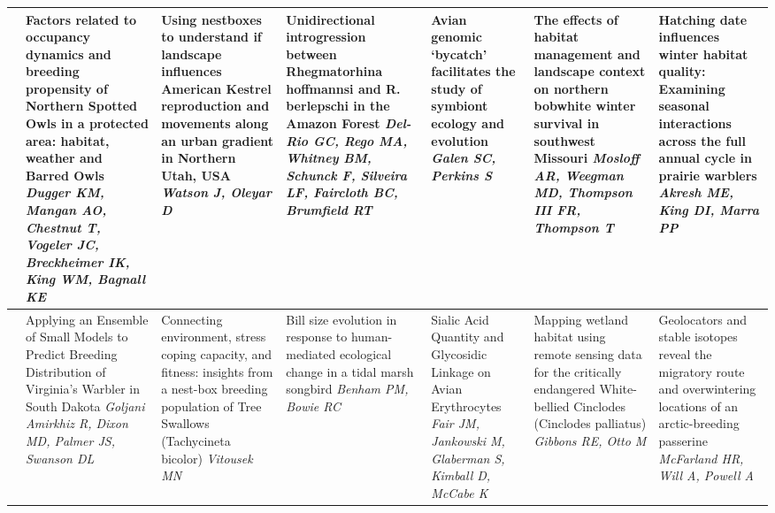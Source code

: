 \begin{tabular}{|x{0.75cm}|x{2.25cm}|a{2.25cm}|x{2.25cm}|x{2.25cm}|x{2.25cm}|x{2.25cm}|}
&Factors related to occupancy dynamics and breeding propensity of Northern Spotted Owls in a protected area: habitat, weather and Barred Owls \newline \newline \textit{Dugger KM, Mangan AO, Chestnut T, Vogeler JC, Breckheimer IK, King WM, Bagnall KE} & Using nestboxes to understand if landscape influences American Kestrel reproduction and movements along an urban gradient in Northern Utah, USA \newline \newline \textit{Watson J, Oleyar D} & Unidirectional introgression between Rhegmatorhina hoffmannsi and R. berlepschi in the Amazon Forest \newline \newline \textit{Del-Rio GC, Rego MA, Whitney BM, Schunck F, Silveira LF, Faircloth BC, Brumfield RT} & Avian genomic ‘bycatch’ facilitates the study of symbiont ecology and evolution \newline \newline \textit{Galen SC, Perkins S} & The effects of habitat management and landscape context on northern bobwhite winter survival in southwest Missouri \newline \newline \textit{Mosloff AR, Weegman MD, Thompson III FR, Thompson T} & Hatching date influences winter habitat quality: Examining seasonal interactions across the full annual cycle in prairie warblers \newline \newline \textit{Akresh ME, King DI, Marra PP}\\
\hline
{}&Applying an Ensemble of Small Models to Predict Breeding Distribution of Virginia’s Warbler in South Dakota \newline \newline \textit{Goljani Amirkhiz R, Dixon MD, Palmer JS, Swanson DL} & Connecting environment, stress coping capacity, and fitness: insights from a nest-box breeding population of Tree Swallows (Tachycineta bicolor) \newline \newline \textit{Vitousek MN} & Bill size evolution in response to human-mediated ecological change in a tidal marsh songbird \newline \newline \textit{Benham PM, Bowie RC} & Sialic Acid Quantity and Glycosidic Linkage on Avian Erythrocytes \newline \newline \textit{Fair JM, Jankowski M, Glaberman S, Kimball D, McCabe K} & Mapping wetland habitat using remote sensing data for the critically endangered White-bellied Cinclodes (Cinclodes palliatus) \newline \newline \textit{Gibbons RE, Otto M} & Geolocators and stable isotopes reveal the migratory route and overwintering locations of an arctic-breeding passerine \newline \newline \textit{McFarland HR, Will A, Powell A}\\

\end{tabular}
